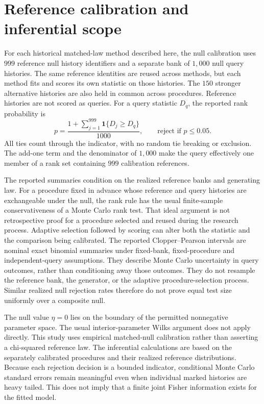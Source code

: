 \section{Reference calibration and inferential scope}

For each historical matched-law method described here, the null calibration uses \(999\) reference null history identifiers and a separate bank of \(1{,}000\) null query histories. The same reference identities are reused across methods, but each method fits and scores its own statistic on those histories. The \(150\) stronger alternative histories are also held in common across procedures. Reference histories are not scored as queries. For a query statistic \(D_q\), the reported rank probability is
\begin{equation}
p=\frac{1+\sum_{j=1}^{999}\mathbf 1\{D_j\ge D_q\}}{1000},
\qquad
\text{reject if }p\le 0.05.
\label{eq:rank-p}
\end{equation}
All ties count through the indicator, with no random tie breaking or exclusion. The add-one term and the denominator of \(1{,}000\) make the query effectively one member of a rank set containing \(999\) calibration references.

The reported summaries condition on the realized reference banks and generating law. For a procedure fixed in advance whose reference and query histories are exchangeable under the null, the rank rule has the usual finite-sample conservativeness of a Monte Carlo rank test. That ideal argument is not retrospective proof for a procedure selected and reused during the research process. Adaptive selection followed by scoring can alter both the statistic and the comparison being calibrated. The reported Clopper--Pearson intervals are nominal exact binomial summaries under fixed-bank, fixed-procedure and independent-query assumptions. They describe Monte Carlo uncertainty in query outcomes, rather than conditioning away those outcomes. They do not resample the reference bank, the generator, or the adaptive procedure-selection process. Similar realized null rejection rates therefore do not prove equal test size uniformly over a composite null.

The null value \(\eta=0\) lies on the boundary of the permitted nonnegative parameter space. The usual interior-parameter Wilks argument does not apply directly. This study uses empirical matched-null calibration rather than asserting a chi-squared reference law. The inferential calculations are based on the separately calibrated procedures and their realized reference distributions. Because each rejection decision is a bounded indicator, conditional Monte Carlo standard errors remain meaningful even when individual marked histories are heavy tailed. This does not imply that a finite joint Fisher information exists for the fitted model.


